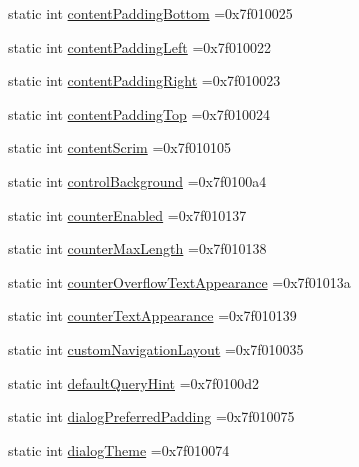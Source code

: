 \begin{DoxyCompactItemize}
\item 
static int \hyperlink{classandroid_1_1support_1_1design_1_1R_1_1attr_a4b9aa67d8274a4e16423c353d91f3276}{content\+Padding\+Bottom} =0x7f010025
\item 
static int \hyperlink{classandroid_1_1support_1_1design_1_1R_1_1attr_af303f4ec3e2b84dffd727eb2ec6b14e3}{content\+Padding\+Left} =0x7f010022
\item 
static int \hyperlink{classandroid_1_1support_1_1design_1_1R_1_1attr_a054943f020d53f79ce410b9278b59a1c}{content\+Padding\+Right} =0x7f010023
\item 
static int \hyperlink{classandroid_1_1support_1_1design_1_1R_1_1attr_aeca630891923da57bf05c2ea8d211897}{content\+Padding\+Top} =0x7f010024
\item 
static int \hyperlink{classandroid_1_1support_1_1design_1_1R_1_1attr_a244937ae170a7899c67a98528a168397}{content\+Scrim} =0x7f010105
\item 
static int \hyperlink{classandroid_1_1support_1_1design_1_1R_1_1attr_a57739b7431147c97b63f735fadc35054}{control\+Background} =0x7f0100a4
\item 
static int \hyperlink{classandroid_1_1support_1_1design_1_1R_1_1attr_a77bf5ed2837ea33d879fd47228e8cd09}{counter\+Enabled} =0x7f010137
\item 
static int \hyperlink{classandroid_1_1support_1_1design_1_1R_1_1attr_a12f7fde0e57068169405793891fc3a8c}{counter\+Max\+Length} =0x7f010138
\item 
static int \hyperlink{classandroid_1_1support_1_1design_1_1R_1_1attr_afd340be60d52f269d6b3ea3f260cef5d}{counter\+Overflow\+Text\+Appearance} =0x7f01013a
\item 
static int \hyperlink{classandroid_1_1support_1_1design_1_1R_1_1attr_a5d6d057b4e0916f2956a030fc7245a8e}{counter\+Text\+Appearance} =0x7f010139
\item 
static int \hyperlink{classandroid_1_1support_1_1design_1_1R_1_1attr_a9d78ff9bcc69bcb05b0d75f4988d0db9}{custom\+Navigation\+Layout} =0x7f010035
\item 
static int \hyperlink{classandroid_1_1support_1_1design_1_1R_1_1attr_a5abb1108b710be231b2aeea1142b9ca2}{default\+Query\+Hint} =0x7f0100d2
\item 
static int \hyperlink{classandroid_1_1support_1_1design_1_1R_1_1attr_ae34cbd26b621f4e2f674c575d7722640}{dialog\+Preferred\+Padding} =0x7f010075
\item 
static int \hyperlink{classandroid_1_1support_1_1design_1_1R_1_1attr_a9d4fd20161a17ac001044defe33997c6}{dialog\+Theme} =0x7f010074

\end{DoxyCompactItemize}
